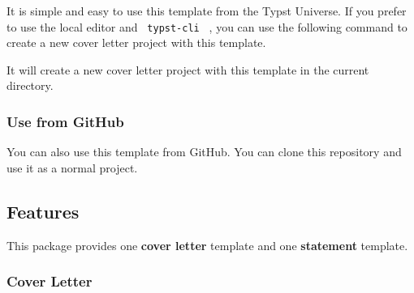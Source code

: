 It is simple and easy to use this template from the Typst Universe. If
you prefer to use the local editor and \texttt{\ typst-cli\ } , you can
use the following command to create a new cover letter project with this
template.

\begin{Shaded}
\begin{Highlighting}[]
\end{Highlighting}
\end{Shaded}

It will create a new cover letter project with this template in the
current directory.

\subsubsection{Use from GitHub}\label{use-from-github}

You can also use this template from GitHub. You can clone this
repository and use it as a normal project.

\begin{Shaded}
\begin{Highlighting}[]
\end{Highlighting}
\end{Shaded}

\subsection{Features}\label{features}

This package provides one \textbf{cover letter} template and one
\textbf{statement} template.

\subsubsection{Cover Letter}\label{cover-letter}

